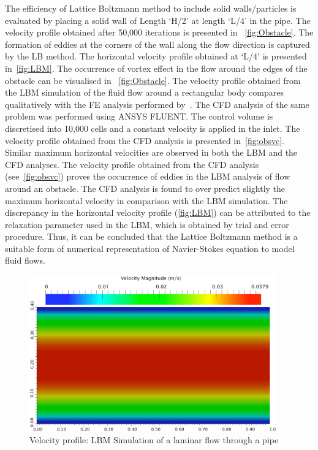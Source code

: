 The efficiency of Lattice Boltzmann method to include solid walls/particles is 
evaluated by placing a solid wall of Length `H/2' at length `L/4' in the pipe. 
The velocity profile obtained after 50,000 iterations is presented in 
~\cref{fig:Obstacle}. The formation of eddies at the corners of the wall along 
the flow direction is captured by the LB method. The horizontal velocity 
profile obtained at `L/4' is presented in~\cref{fig:LBM}. The occurrence of 
vortex effect in the flow around the edges of the obstacle can be visualised in 
~\cref{fig:Obstacle}. The velocity profile obtained from the LBM simulation of 
the fluid flow around a rectangular body compares qualitatively with the FE 
analysis performed by~\citet{Zhong1991}. The CFD analysis of the same problem 
was performed using ANSYS FLUENT. The control volume is discretised into 10,000 
cells and a constant velocity is applied in the inlet. The velocity profile 
obtained from the CFD analysis is presented in~\cref{fig:obsvc}. Similar 
maximum horizontal velocities are observed in both the LBM and the CFD 
analyses. The velocity profile obtained from the CFD analysis 
(see~\cref{fig:obsvc}) proves the occurrence of eddies in the LBM analysis of 
flow around an obstacle. The CFD analysis is found to over predict slightly the 
maximum horizontal velocity in comparison with the LBM simulation. The 
discrepancy in the horizontal velocity profile (\cref{fig:LBM}) can be 
attributed to the relaxation parameter used in the LBM, which is obtained by 
trial and error procedure. Thus, it can be concluded that the Lattice Boltzmann 
method is a suitable form of numerical representation of Navier-Stokes equation 
to model fluid flows. 

\begin{figure}[h]
\centering
\includegraphics[width=0.95\textwidth]{LBM_Poiseuille}
\caption{Velocity profile: LBM Simulation of a laminar flow through a pipe}
\label{fig:LBM_Poiseuille}
\end{figure}


